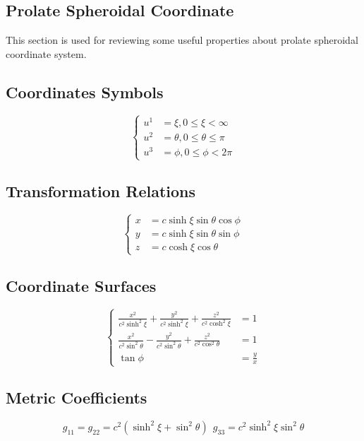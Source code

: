 \documentclass[fontsize=11pt, %
                             paper=a4, %
                             twoside, %
                             captions=tableheading,
                             index=totoc,
                             hyperref]{labbook}
\begin{document}
\begin{addmargin}[4cm]{0cm}
\section{Prolate Spheroidal Coordinate}
This section is used for reviewing some useful properties about prolate spheroidal coordinate system.\cite{MoonSpencer1988}
\subsection{Coordinates Symbols}
\begin{equation}
\left\{
\begin{aligned}
u^1&=\xi , 0\le\xi<\infty\\
u^2&=\theta,0\le\theta\le\pi\\
u^3&=\phi,0\le\phi<2\pi
\end{aligned}
\right.
\end{equation}
\subsection{Transformation Relations}
\begin{equation}
\left\{
\begin{aligned}
x&=c\sinh\xi\sin\theta\cos\phi\\
y&=c\sinh\xi\sin\theta\sin\phi\\
z&=c\cosh\xi\cos\theta
\end{aligned}
\right.
\end{equation}
\subsection{Coordinate Surfaces}
\begin{equation}
\left\{
\begin{aligned}
\frac{x^2}{c^2\sinh^2\xi}+\frac{y^2}{c^2\sinh^2\xi}+\frac{z^2}{c^2\cosh^2\xi}&=1\\
\frac{x^2}{c^2\sin^2\theta}-\frac{y^2}{c^2\sin^2\theta}+\frac{z^2}{c^2\cos^2\theta}&=1\\
\tan\phi&=\frac{y}{x}
\end{aligned}
\right.
\end{equation}
\subsection{Metric Coefficients}
\begin{equation}
g_{11}=g_{22}=c^2(\sinh^2\xi+\sin^2\theta)\ \ g_{33}=c^2\sinh^2\xi\sin^2\theta
\end{equation}

\end{addmargin}
\end{document}
